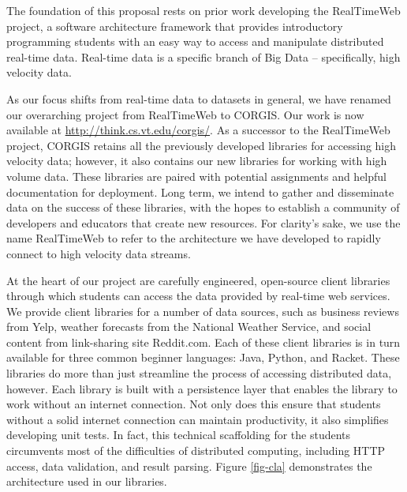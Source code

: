 The foundation of this proposal rests on prior work developing the RealTimeWeb project, a software architecture framework that provides introductory programming students with an easy way to access and manipulate distributed real-time data\cite{realtimeweb}.
Real-time data is a specific branch of Big Data -- specifically, high velocity data.

As our focus shifts from real-time data to datasets in general, we have renamed our overarching project from RealTimeWeb to CORGIS. Our work is now available at \url{http://think.cs.vt.edu/corgis/}. As a successor to the RealTimeWeb project, CORGIS retains all the previously developed libraries for accessing high velocity data; however, it also contains our new libraries for working with high volume data.
These libraries are paired with potential assignments and helpful documentation for deployment.
Long term, we intend to gather and disseminate data on the success of these libraries, with the hopes to establish a community of developers and educators that create new resources.
For clarity's sake, we use the name RealTimeWeb to refer to the architecture we have developed to rapidly connect to high velocity data streams.

At the heart of our project are carefully engineered, open-source client libraries through which students can access the data provided by real-time web services.
We provide client libraries for a number of data sources, such as business reviews from Yelp, weather forecasts from the National Weather Service, and social content from link-sharing site Reddit.com.
Each of these client libraries is in turn available for three common beginner languages: Java, Python, and Racket. 
These libraries do more than just streamline the process of accessing distributed data, however. Each library is built with a persistence layer that enables the library to work without an internet connection.
Not only does this ensure that students without a solid internet connection can maintain productivity, it also simplifies developing unit tests. 
In fact, this technical scaffolding for the students circumvents most of the difficulties of distributed computing, including HTTP access, data validation, and result parsing.
Figure \ref{fig-cla} demonstrates the architecture used in our libraries.

